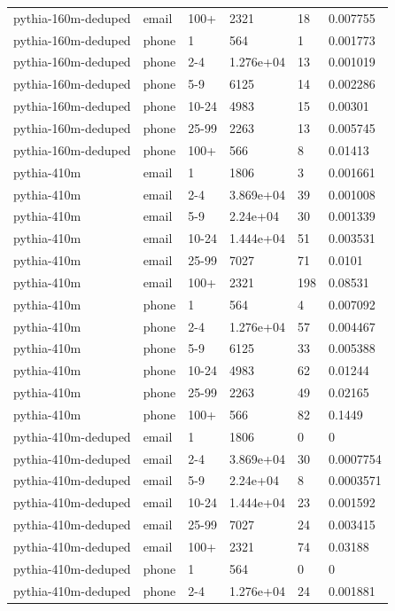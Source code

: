 \begin{tabular}{llllll}
pythia-160m-deduped & email & 100+ & 2321 & 18 & 0.007755 \\
pythia-160m-deduped & phone & 1 & 564 & 1 & 0.001773 \\
pythia-160m-deduped & phone & 2-4 & 1.276e+04 & 13 & 0.001019 \\
pythia-160m-deduped & phone & 5-9 & 6125 & 14 & 0.002286 \\
pythia-160m-deduped & phone & 10-24 & 4983 & 15 & 0.00301 \\
pythia-160m-deduped & phone & 25-99 & 2263 & 13 & 0.005745 \\
pythia-160m-deduped & phone & 100+ & 566 & 8 & 0.01413 \\
pythia-410m & email & 1 & 1806 & 3 & 0.001661 \\
pythia-410m & email & 2-4 & 3.869e+04 & 39 & 0.001008 \\
pythia-410m & email & 5-9 & 2.24e+04 & 30 & 0.001339 \\
pythia-410m & email & 10-24 & 1.444e+04 & 51 & 0.003531 \\
pythia-410m & email & 25-99 & 7027 & 71 & 0.0101 \\
pythia-410m & email & 100+ & 2321 & 198 & 0.08531 \\
pythia-410m & phone & 1 & 564 & 4 & 0.007092 \\
pythia-410m & phone & 2-4 & 1.276e+04 & 57 & 0.004467 \\
pythia-410m & phone & 5-9 & 6125 & 33 & 0.005388 \\
pythia-410m & phone & 10-24 & 4983 & 62 & 0.01244 \\
pythia-410m & phone & 25-99 & 2263 & 49 & 0.02165 \\
pythia-410m & phone & 100+ & 566 & 82 & 0.1449 \\
pythia-410m-deduped & email & 1 & 1806 & 0 & 0 \\
pythia-410m-deduped & email & 2-4 & 3.869e+04 & 30 & 0.0007754 \\
pythia-410m-deduped & email & 5-9 & 2.24e+04 & 8 & 0.0003571 \\
pythia-410m-deduped & email & 10-24 & 1.444e+04 & 23 & 0.001592 \\
pythia-410m-deduped & email & 25-99 & 7027 & 24 & 0.003415 \\
pythia-410m-deduped & email & 100+ & 2321 & 74 & 0.03188 \\
pythia-410m-deduped & phone & 1 & 564 & 0 & 0 \\
pythia-410m-deduped & phone & 2-4 & 1.276e+04 & 24 & 0.001881 \\

\end{tabular}
